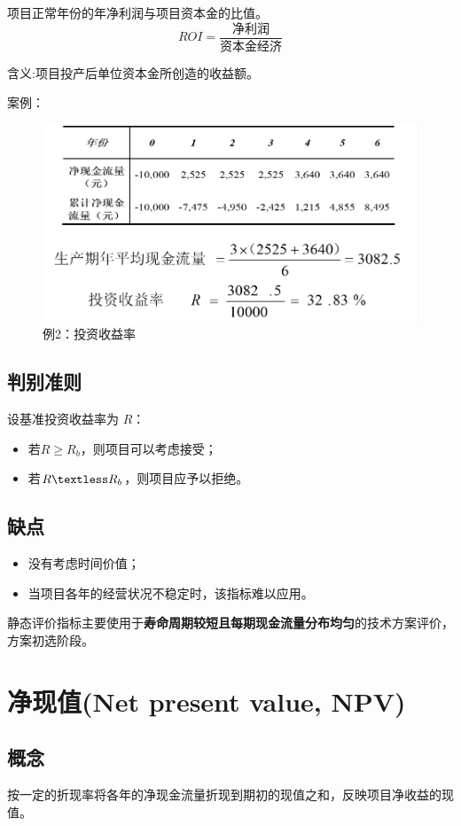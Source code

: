 项目正常年份的年净利润与项目资本金的比值。
$$ROI=\frac{\mbox{净利润}}{\mbox{资本金经济}}$$

含义:项目投产后单位资本金所创造的收益额。

案例：
\begin{figure}[H]
    \centering
    \includegraphics[width=\textwidth]{image/roi.png}
    \caption{例2：投资收益率}
    \label{fig:2}
\end{figure}

\subsection{判别准则}
设基准投资收益率为 $R$：
\begin{itemize}
    \item 若$R \geq R_b$，则项目可以考虑接受；
    \item 若$R \textless R_b$，则项目应予以拒绝。
\end{itemize}

\subsection{缺点}
\begin{itemize}
    \item 没有考虑时间价值；
    \item 当项目各年的经营状况不稳定时，该指标难以应用。
\end{itemize}

静态评价指标主要使用于\textbf{寿命周期较短且每期现金流量分布均匀}的技术方案评价，方案初选阶段。

\section{净现值(Net present value, NPV)}

\subsection{概念}
按一定的折现率将各年的净现金流量折现到期初的现值之和，反映项目净收益的现值。
